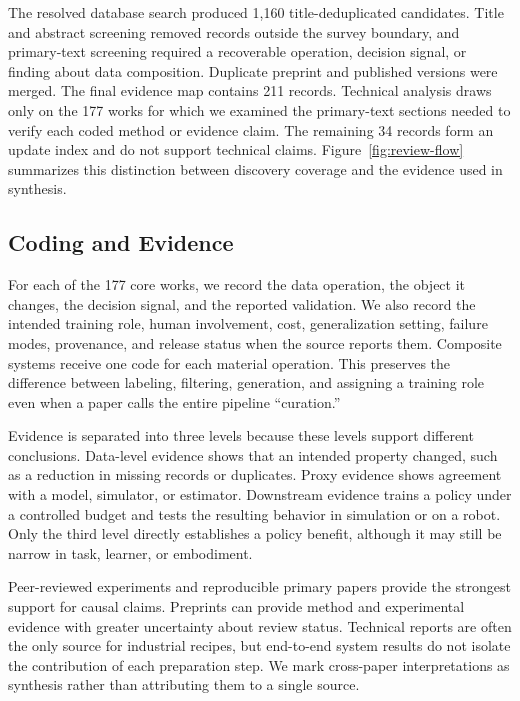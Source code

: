 The resolved database search produced 1,160 title-deduplicated candidates.
Title and abstract screening removed records outside the survey boundary, and primary-text screening required a recoverable operation, decision signal, or finding about data composition.
Duplicate preprint and published versions were merged.
The final evidence map contains 211 records.
Technical analysis draws only on the 177 works for which we examined the primary-text sections needed to verify each coded method or evidence claim.
The remaining 34 records form an update index and do not support technical claims.
Figure~\ref{fig:review-flow} summarizes this distinction between discovery coverage and the evidence used in synthesis.



\subsection{Coding and Evidence}

For each of the 177 core works, we record the data operation, the object it changes, the decision signal, and the reported validation.
We also record the intended training role, human involvement, cost, generalization setting, failure modes, provenance, and release status when the source reports them.
Composite systems receive one code for each material operation.
This preserves the difference between labeling, filtering, generation, and assigning a training role even when a paper calls the entire pipeline ``curation.''

Evidence is separated into three levels because these levels support different conclusions.
Data-level evidence shows that an intended property changed, such as a reduction in missing records or duplicates.
Proxy evidence shows agreement with a model, simulator, or estimator.
Downstream evidence trains a policy under a controlled budget and tests the resulting behavior in simulation or on a robot.
Only the third level directly establishes a policy benefit, although it may still be narrow in task, learner, or embodiment.

Peer-reviewed experiments and reproducible primary papers provide the strongest support for causal claims.
Preprints can provide method and experimental evidence with greater uncertainty about review status.
Technical reports are often the only source for industrial recipes, but end-to-end system results do not isolate the contribution of each preparation step.
We mark cross-paper interpretations as synthesis rather than attributing them to a single source.

